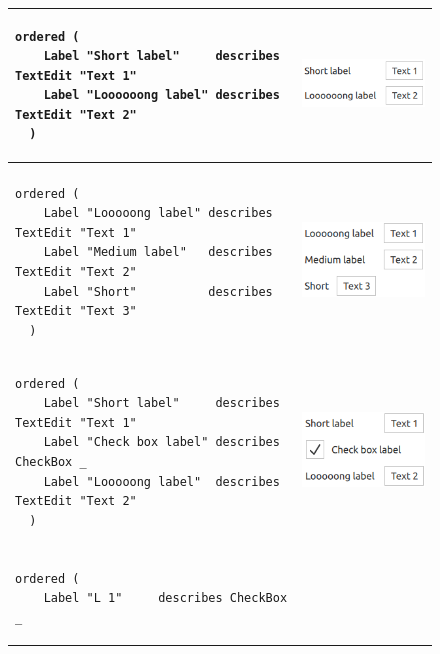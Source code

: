 \begin{figure}
    \begin{tabular}{m{95mm}m{5cm}}
      \begin{lstlisting}[basicstyle=\small]
  ordered (
    Label "Short label"     describes TextEdit "Text 1"
    Label "Loooooong label" describes TextEdit "Text 2"
  )
      \end{lstlisting} &
      \includegraphics[scale=0.5]{Example1-Qt-QML.png} \\
      \hline\\
      \begin{lstlisting}[basicstyle=\small]
  ordered (
    Label "Looooong label" describes TextEdit "Text 1"
    Label "Medium label"   describes TextEdit "Text 2"
    Label "Short"          describes TextEdit "Text 3"
  )
      \end{lstlisting} &
      \includegraphics[scale=0.5]{Example2-Qt-QML.png} \\
      \hline
      \begin{lstlisting}[basicstyle=\small]
  ordered (
    Label "Short label"     describes TextEdit "Text 1"
    Label "Check box label" describes CheckBox _
    Label "Looooong label"  describes TextEdit "Text 2"
  )
      \end{lstlisting} &
      \vspace{1em}\includegraphics[scale=0.5]{Example4-Qt-QML.png} \\
      \hline\\
      \begin{lstlisting}[basicstyle=\small]
  ordered (
    Label "L 1"     describes CheckBox _

\end{lstlisting}
\end{tabular}
\end{figure}
